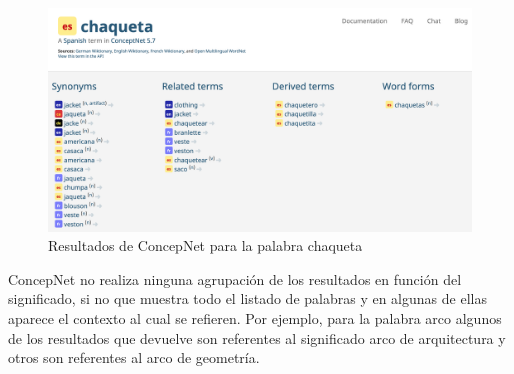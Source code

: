 \begin{figure}[!h]
	\includegraphics[width=.9\textwidth]{Imagenes/Bitmap/Capitulo2/busquedaConcepnet.png}
	\caption{Resultados de ConcepNet para la palabra chaqueta}
	\label{fig:busquedaConcepnet}
\end{figure}
ConcepNet no realiza ninguna agrupación de los resultados en función del significado, si no que muestra todo el listado de palabras y en algunas de ellas aparece el contexto al cual se refieren. Por ejemplo, para la palabra arco algunos de los resultados que devuelve son referentes al significado arco de arquitectura y otros son referentes al arco de geometría.


